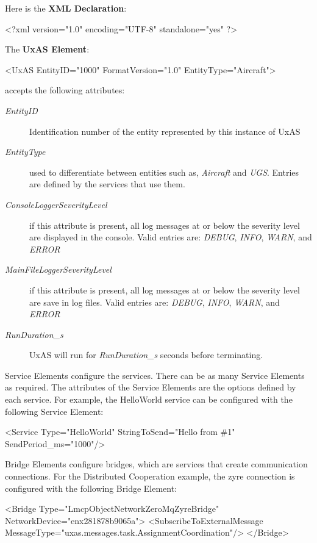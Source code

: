 Here is the \textbf{XML Declaration}:
\begin{docspec}<?xml version="1.0" encoding="UTF-8" standalone="yes" ?>\end{docspec}
The \textbf{UxAS Element}:
\begin{docspec}
	<UxAS EntityID="1000" FormatVersion="1.0" EntityType="Aircraft">
\end{docspec}
accepts the following attributes:
\begin{description}
	\item[\textit{EntityID}] Identification number of the entity represented by this instance of UxAS
	\item[\textit{EntityType}] used to differentiate between entities such as, \textit{Aircraft} and \textit{UGS}. Entries are defined by the services that use them.
	\item[\textit{ConsoleLoggerSeverityLevel}] if this attribute is present, all log messages at or below the severity level are displayed in the console. Valid entries are: \textit{DEBUG}, \textit{INFO}, \textit{WARN}, and \textit{ERROR}
	\item[\textit{MainFileLoggerSeverityLevel}] if this attribute is present, all log messages at or below the severity level are save in log files. Valid entries are: \textit{DEBUG}, \textit{INFO}, \textit{WARN}, and \textit{ERROR}
	\item[\textit{RunDuration\_s}] UxAS will run for \textit{RunDuration\_s} seconds before terminating.
\end{description}
Service Elements configure the services. There can be as many Service Elements as required. The attributes of the Service Elements are the options defined by each service. For example, the HelloWorld service can be configured with the following Service Element:
\begin{docspec}
	<Service Type="HelloWorld" StringToSend="Hello from \#1" SendPeriod\_ms="1000"/>
\end{docspec}
Bridge Elements configure bridges, which are services that create communication connections. For the Distributed Cooperation example, the zyre connection is configured with the following Bridge Element:
\begin{docspec}
    <Bridge Type="LmcpObjectNetworkZeroMqZyreBridge" NetworkDevice="enx281878b9065a">
	\quad<SubscribeToExternalMessage MessageType="uxas.messages.task.AssignmentCoordination"/>
	</Bridge>
\end{docspec}




